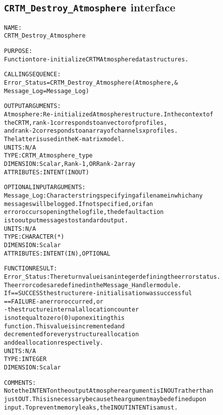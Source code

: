\subsection{\texttt{CRTM\_Destroy\_Atmosphere} interface}
  \label{sec:CRTM_Destroy_Atmosphere_interface}
  \begin{alltt}
 
  NAME:
        CRTM_Destroy_Atmosphere
  
  PURPOSE:
        Function to re-initialize CRTM Atmosphere data structures.
 
  CALLING SEQUENCE:
        Error_Status = CRTM_Destroy_Atmosphere( Atmosphere             , &
                                                Message_Log=Message_Log  )
 
  OUTPUT ARGUMENTS:
        Atmosphere:   Re-initialized Atmosphere structure. In the context of
                      the CRTM, rank-1 corresponds to an vector of profiles,
                      and rank-2 corresponds to an array of channels x profiles.
                      The latter is used in the K-matrix model.
                      UNITS:      N/A
                      TYPE:       CRTM_Atmosphere_type
                      DIMENSION:  Scalar, Rank-1, OR Rank-2 array
                      ATTRIBUTES: INTENT(IN OUT)
 
  OPTIONAL INPUT ARGUMENTS:
        Message_Log:  Character string specifying a filename in which any
                      messages will be logged. If not specified, or if an
                      error occurs opening the log file, the default action
                      is to output messages to standard output.
                      UNITS:      N/A
                      TYPE:       CHARACTER(*)
                      DIMENSION:  Scalar
                      ATTRIBUTES: INTENT(IN), OPTIONAL
 
  FUNCTION RESULT:
        Error_Status: The return value is an integer defining the error status.
                      The error codes are defined in the Message_Handler module.
                      If == SUCCESS the structure re-initialisation was successful
                         == FAILURE - an error occurred, or
                                    - the structure internal allocation counter
                                      is not equal to zero (0) upon exiting this
                                      function. This value is incremented and
                                      decremented for every structure allocation
                                      and deallocation respectively.
                      UNITS:      N/A
                      TYPE:       INTEGER
                      DIMENSION:  Scalar
 
  COMMENTS:
        Note the INTENT on the output Atmosphere argument is IN OUT rather than
        just OUT. This is necessary because the argument may be defined upon
        input. To prevent memory leaks, the IN OUT INTENT is a must.
 
  \end{alltt}
